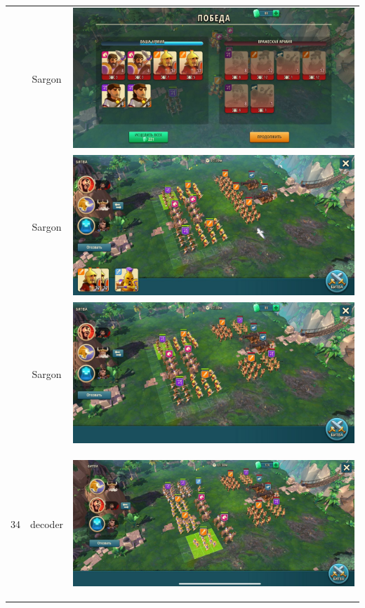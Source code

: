 \begin{longtable}{|c|c|c|}
	& Sargon &
	\includegraphics[width=0.75\linewidth]{./parts/media/TreasureHunt/34/sargon/photo_2022-04-07_10-08-23.jpg} \\
	& Sargon &
	\includegraphics[width=0.75\linewidth]{./parts/media/TreasureHunt/34/sargon/photo_2022-04-07_10-08-04.jpg} \\
	& Sargon &
	\includegraphics[width=0.75\linewidth]{./parts/media/TreasureHunt/34/sargon/photo_2022-04-07_10-08-19.jpg} \\
	\hline
	\multirow{8}{*}{34} & decoder &
	\hypertarget{fight34}{\includegraphics[width=0.75\linewidth]{./parts/media/TreasureHunt/34/decoder/photo_2022-04-07_10-02-46.jpg}} \\

\end{longtable}
